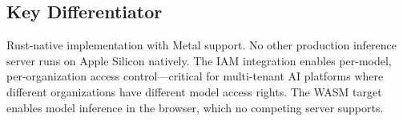 \subsection{Key Differentiator}

Rust-native implementation with Metal support. No other production inference server runs on Apple Silicon natively. The IAM integration enables per-model, per-organization access control---critical for multi-tenant AI platforms where different organizations have different model access rights. The WASM target enables model inference in the browser, which no competing server supports.

